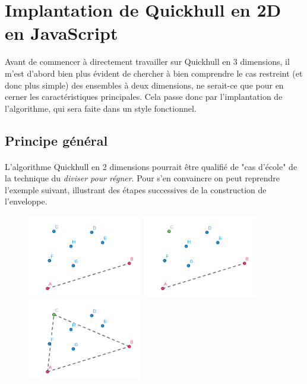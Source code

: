 \documentclass[]{article}
\begin{document}
\section{Implantation de Quickhull en 2D en JavaScript}
Avant de commencer à directement travailler sur Quickhull en 3 dimensions, il m'est d'abord bien plus évident de chercher à bien comprendre le cas restreint (et donc plus simple) des ensembles à deux dimensions, ne serait-ce que pour en cerner les caractéristiques principales. Cela passe donc par l'implantation de l'algorithme, qui sera faite dans un style fonctionnel.

\subsection{Principe général}
\paragraph{}
L'algorithme Quickhull en 2 dimensions pourrait être qualifié de "cas d'école" de la technique du \emph{diviser pour régner}. Pour s'en convaincre on peut reprendre l'exemple suivant, illustrant des étapes successives de la construction de l'enveloppe.

\begin{figure}[H]
	\begin{center}
		\includegraphics[width=5cm]{qh2d/geogebra-export.png}
		\includegraphics[width=5cm]{qh2d/geogebra-export2.png}
		\includegraphics[width=5cm]{qh2d/geogebra-export3.png}
	\end{center}
\end{figure}
\end{document}
